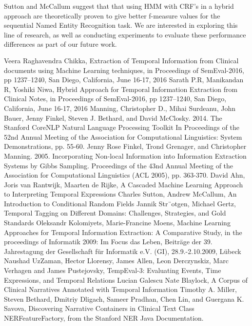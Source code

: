 \documentclass[letterpaper, 10 pt, conference]{ieeeconf}
\begin{document}
Sutton and McCallum\cite{c6} suggest that that using HMM with CRF's in a hybrid approach are theoretically proven to give better f-measure values for the sequential Named Entity Recognition task. We are interested in exploring this line of research, as well as conducting experiments to evaluate these performance differences as part of our future work.

\begin{thebibliography}{99}

 Veera Raghavendra Chikka,  Extraction of Temporal Information from Clinical documents using Machine Learning techniques, in Proceedings of SemEval-2016, pp 1237–1240, San Diego, California, June 16-17, 2016
 Sarath P.R, Manikandan R, Yoshiki Niwa, Hybrid Approach for Temporal Information Extraction from Clinical Notes, in Proceedings of SemEval-2016, pp 1237–1240, San Diego, California, June 16-17, 2016
 Manning, Christopher D., Mihai Surdeanu, John Bauer, Jenny Finkel, Steven J. Bethard, and David McClosky. 2014. The Stanford CoreNLP Natural Language Processing Toolkit In Proceedings of the 52nd Annual Meeting of the Association for Computational Linguistics: System Demonstrations, pp. 55-60.
 Jenny Rose Finkel, Trond Grenager, and Christopher Manning. 2005. Incorporating Non-local Information into Information Extraction Systems by Gibbs Sampling. Proceedings of the 43nd Annual Meeting of the Association for Computational Linguistics (ACL 2005), pp. 363-370.
 David Ahn, Joris van Rantwijk, Maarten de Rijke, A Cascaded Machine Learning Approach to Interpreting Temporal Expressions
 Charles Sutton, Andrew McCallum, An Introduction to Conditional Random Fields
 Jannik Str¨otgen, Michael Gertz, Temporal Tagging on Different Domains: Challenges, Strategies, and Gold Standards
 Oleksandr Kolomiyets, Marie-Francine Moens, Machine Learning Approaches for Temporal Information Extraction: A Comparative Study, in the proceedings of Informatik 2009: Im Focus das Leben, Beiträge der 39. Jahrestagung der Gesellschaft für Informatik e.V. (GI), 28.9.-2.10.2009, Lübeck
 Naushad UzZaman, Hector Llorensy, James Allen, Leon Derczynskiz, Marc Verhagen and James Pustejovsky, TempEval-3: Evaluating Events, Time Expressions, and Temporal Relations
 Lucian Galescu Nate Blaylock, A Corpus of Clinical Narratives Annotated with Temporal Information
 Timothy A. Miller, Steven Bethard, Dmitriy Dligach, Sameer Pradhan, Chen Lin, and Guergana K. Savova, Discovering Narrative Containers in Clinical Text
 Class NERFeatureFactory, from the Stanford NER Java Documentation.


\end{thebibliography}
\end{document}
